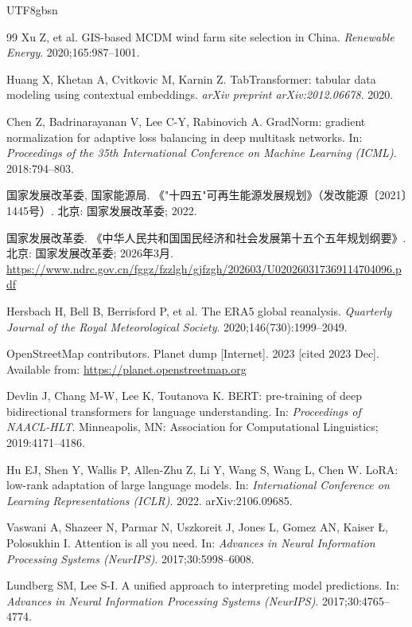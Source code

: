 \documentclass[12pt, a4paper]{article}
\begin{document}
\begin{CJK}{UTF8}{gbsn}
\begin{thebibliography}{99}
Xu Z, et al.
GIS-based MCDM wind farm site selection in China.
\textit{Renewable Energy}.
2020;165:987--1001.

Huang X, Khetan A, Cvitkovic M, Karnin Z.
TabTransformer: tabular data modeling using contextual embeddings.
\textit{arXiv preprint arXiv:2012.06678}.
2020.

Chen Z, Badrinarayanan V, Lee C-Y, Rabinovich A.
GradNorm: gradient normalization for adaptive loss balancing
in deep multitask networks.
In: \textit{Proceedings of the 35th International Conference on
Machine Learning (ICML)}.
2018:794--803.

国家发展改革委, 国家能源局.
《"十四五"可再生能源发展规划》（发改能源〔2021〕1445号）.
北京: 国家发展改革委; 2022.

国家发展改革委.
《中华人民共和国国民经济和社会发展第十五个五年规划纲要》.
北京: 国家发展改革委; 2026年3月.
\url{https://www.ndrc.gov.cn/fggz/fzzlgh/gjfzgh/202603/U020260317369114704096.pdf}

Hersbach H, Bell B, Berrisford P, et al.
The ERA5 global reanalysis.
\textit{Quarterly Journal of the Royal Meteorological Society}.
2020;146(730):1999--2049.

OpenStreetMap contributors.
Planet dump [Internet].
2023 [cited 2023 Dec].
Available from: \url{https://planet.openstreetmap.org}

Devlin J, Chang M-W, Lee K, Toutanova K.
BERT: pre-training of deep bidirectional transformers for
language understanding.
In: \textit{Proceedings of NAACL-HLT}.
Minneapolis, MN: Association for Computational Linguistics;
2019:4171--4186.

Hu EJ, Shen Y, Wallis P, Allen-Zhu Z, Li Y,
Wang S, Wang L, Chen W.
LoRA: low-rank adaptation of large language models.
In: \textit{International Conference on Learning Representations
(ICLR)}.
2022. arXiv:2106.09685.

Vaswani A, Shazeer N, Parmar N, Uszkoreit J, Jones L,
Gomez AN, Kaiser {\L}, Polosukhin I.
Attention is all you need.
In: \textit{Advances in Neural Information Processing Systems
(NeurIPS)}.
2017;30:5998--6008.

Lundberg SM, Lee S-I.
A unified approach to interpreting model predictions.
In: \textit{Advances in Neural Information Processing Systems
(NeurIPS)}.
2017;30:4765--4774.


\end{thebibliography}
\end{CJK}
\end{document}
